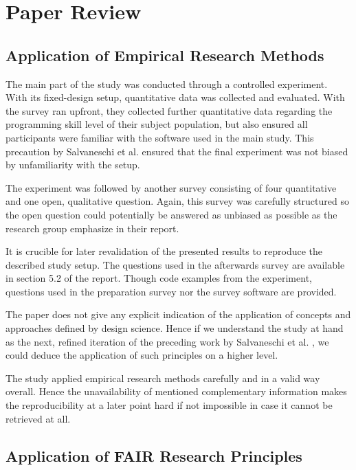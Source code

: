 \documentclass[12pt,a4paper]{article}
\begin{document}
\section{Paper Review}

\subsection{Application of Empirical Research Methods}

The main part of the study was conducted through a controlled experiment. With its fixed-design setup, quantitative data was collected and evaluated. With the survey ran upfront, they collected further quantitative data regarding the programming skill level of their subject population, but also ensured all participants were familiar with the software used in the main study. This precaution by Salvaneschi et al. ensured that the final experiment was not biased by unfamiliarity with the setup.

The experiment was followed by another survey consisting of four quantitative and one open, qualitative question. Again, this survey was carefully structured so the open question could potentially be answered as unbiased as possible as the research group emphasize in their report.

It is crucible for later revalidation of the presented results to reproduce the described study setup. The questions used in the afterwards survey are available in section 5.2 of the report. Though code examples from the experiment, questions used in the preparation survey nor the survey software are provided.

The paper does not give any explicit indication of the application of concepts and approaches defined by design science. Hence if we understand the  study at hand as the next, refined iteration of the preceding work by Salvaneschi et al. \cite{Salvaneschi:2014:ESP:2635868.2635895}, we could deduce the application of such principles on a higher level.

The study applied empirical research methods carefully and in a valid way overall. Hence the unavailability of mentioned complementary information makes the reproducibility at a later point hard if not impossible in case it cannot be retrieved at all.

\subsection{Application of FAIR Research Principles}
\end{document}
